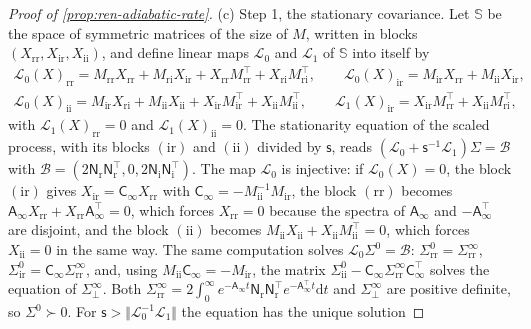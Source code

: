 \begin{proof}[Proof of \cref{prop:ren-adiabatic-rate}]
(c) Step 1, the stationary covariance. Let $\mathbb S$ be the space of symmetric matrices of the size of $M$, written in blocks $(X_{\mathrm{rr}},X_{\mathrm{ir}},X_{\mathrm{ii}})$, and define linear maps $\mathcal L_0$ and $\mathcal L_1$ of $\mathbb S$ into itself by
\[
\begin{gathered}
\mathcal L_0(X)_{\mathrm{rr}}=M_{\mathrm{rr}}X_{\mathrm{rr}}+M_{\mathrm{ri}}X_{\mathrm{ir}}+X_{\mathrm{rr}}M_{\mathrm{rr}}^\top+X_{\mathrm{ri}}M_{\mathrm{ri}}^\top,\qquad\mathcal L_0(X)_{\mathrm{ir}}=M_{\mathrm{ir}}X_{\mathrm{rr}}+M_{\mathrm{ii}}X_{\mathrm{ir}},\\
\mathcal L_0(X)_{\mathrm{ii}}=M_{\mathrm{ir}}X_{\mathrm{ri}}+M_{\mathrm{ii}}X_{\mathrm{ii}}+X_{\mathrm{ir}}M_{\mathrm{ir}}^\top+X_{\mathrm{ii}}M_{\mathrm{ii}}^\top,\qquad\mathcal L_1(X)_{\mathrm{ir}}=X_{\mathrm{ir}}M_{\mathrm{rr}}^\top+X_{\mathrm{ii}}M_{\mathrm{ri}}^\top,
\end{gathered}
\]
with $\mathcal L_1(X)_{\mathrm{rr}}=0$ and $\mathcal L_1(X)_{\mathrm{ii}}=0$. The stationarity equation of the scaled process, with its blocks $(\mathrm{ir})$ and $(\mathrm{ii})$ divided by $\mathsf s$, reads $(\mathcal L_0+\mathsf s^{-1}\mathcal L_1)\Sigma=\mathcal B$ with $\mathcal B=(2\mathsf N_{\mathrm r}\mathsf N_{\mathrm r}^\top,0,2\mathsf N_{\mathrm i}\mathsf N_{\mathrm i}^\top)$. The map $\mathcal L_0$ is injective: if $\mathcal L_0(X)=0$, the block $(\mathrm{ir})$ gives $X_{\mathrm{ir}}=\mathsf C_\infty X_{\mathrm{rr}}$ with $\mathsf C_\infty=-M_{\mathrm{ii}}^{-1}M_{\mathrm{ir}}$, the block $(\mathrm{rr})$ becomes $\mathsf A_\infty X_{\mathrm{rr}}+X_{\mathrm{rr}}\mathsf A_\infty^\top=0$, which forces $X_{\mathrm{rr}}=0$ because the spectra of $\mathsf A_\infty$ and $-\mathsf A_\infty^\top$ are disjoint, and the block $(\mathrm{ii})$ becomes $M_{\mathrm{ii}}X_{\mathrm{ii}}+X_{\mathrm{ii}}M_{\mathrm{ii}}^\top=0$, which forces $X_{\mathrm{ii}}=0$ in the same way. The same computation solves $\mathcal L_0\Sigma^0=\mathcal B$: $\Sigma^0_{\mathrm{rr}}=\Sigma^\infty_{\mathrm{rr}}$, $\Sigma^0_{\mathrm{ir}}=\mathsf C_\infty\Sigma^\infty_{\mathrm{rr}}$, and, using $M_{\mathrm{ii}}\mathsf C_\infty=-M_{\mathrm{ir}}$, the matrix $\Sigma^0_{\mathrm{ii}}-\mathsf C_\infty\Sigma^\infty_{\mathrm{rr}}\mathsf C_\infty^\top$ solves the equation of $\Sigma^\infty_\perp$. Both $\Sigma^\infty_{\mathrm{rr}}=2\int_0^\infty e^{-\mathsf A_\infty t}\mathsf N_{\mathrm r}\mathsf N_{\mathrm r}^\top e^{-\mathsf A_\infty^\top t}\mathrm dt$ and $\Sigma^\infty_\perp$ are positive definite, so $\Sigma^0\succ0$. For $\mathsf s>\Vert\mathcal L_0^{-1}\mathcal L_1\Vert$ the equation has the unique solution

\end{proof}
